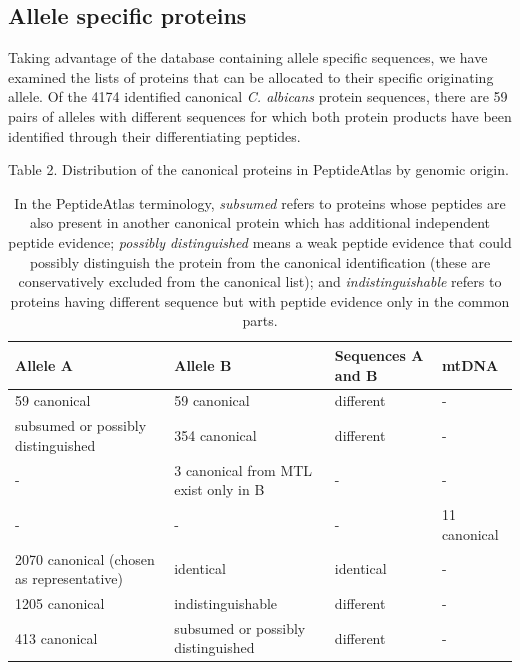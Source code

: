 \subsection*{Allele specific proteins}

Taking advantage of the database containing allele specific sequences, we have examined
the lists of proteins that can be allocated to their specific originating allele.
Of the 4174 identified canonical \textit{C. albicans} protein sequences, there are 59 pairs of alleles
with different sequences for which both protein products have been identified through their
differentiating peptides.

\begin{table}[t]
\caption*{Table 2. Distribution of the canonical proteins in PeptideAtlas by genomic origin.}
\renewcommand{\arraystretch}{2}
\footnotesize
\centering
\begin{tabular}{p{2cm} p{2.5cm} p{2.5cm} p{2cm} }
\hline
Allele A  & Allele B & Sequences A and B & mtDNA \\
\hline
59 canonical & 59 canonical & different & -\\
subsumed or \newline possibly \mbox{distinguished} & 354 canonical & different & -\\
- & 3 canonical from MTL \newline exist only in B & - & -\\
- & - & - & 11 canonical \\
2070 canonical \newline (chosen as \mbox{representative}) & identical & identical & - \\
1205 canonical & indistinguishable & different & - \\
413 canonical & subsumed or \newline possibly distinguished & different & - \\
\hline
\end{tabular}
\medskip
\caption*{In the
PeptideAtlas terminology, \emph{subsumed} refers to proteins whose peptides are also present in another
canonical protein which has additional independent peptide evidence; \emph{possibly distinguished}
means a weak peptide evidence that could possibly distinguish the protein from the canonical
identification (these are conservatively excluded from the canonical list); and \emph{indistinguishable}
refers to proteins having different sequence but with peptide evidence only in the common parts.}
\end{table}


